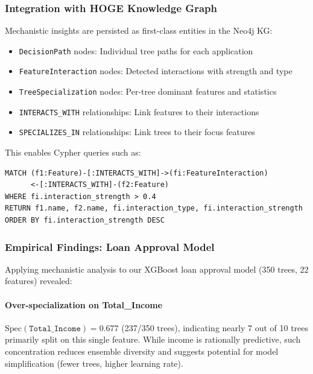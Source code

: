 \subsubsection{Integration with HOGE Knowledge Graph}

Mechanistic insights are persisted as first-class entities in the Neo4j KG:
\begin{itemize}
    \item \texttt{DecisionPath} nodes: Individual tree paths for each application
    \item \texttt{FeatureInteraction} nodes: Detected interactions with strength and type
    \item \texttt{TreeSpecialization} nodes: Per-tree dominant features and statistics
    \item \texttt{INTERACTS\_WITH} relationships: Link features to their interactions
    \item \texttt{SPECIALIZES\_IN} relationships: Link trees to their focus features
\end{itemize}

This enables Cypher queries such as:
\begin{verbatim}
MATCH (f1:Feature)-[:INTERACTS_WITH]->(fi:FeatureInteraction)
      <-[:INTERACTS_WITH]-(f2:Feature)
WHERE fi.interaction_strength > 0.4
RETURN f1.name, f2.name, fi.interaction_type, fi.interaction_strength
ORDER BY fi.interaction_strength DESC
\end{verbatim}

\subsubsection{Empirical Findings: Loan Approval Model}

Applying mechanistic analysis to our XGBoost loan approval model (350 trees, 22 features) revealed:

\paragraph{Over-specialization on Total\_Income}
$\text{Spec}(\texttt{Total\_Income}) = 0.677$ (237/350 trees), indicating nearly 7 out of 10 trees primarily split on this single feature. While income is rationally predictive, such concentration reduces ensemble diversity and suggests potential for model simplification (fewer trees, higher learning rate).

